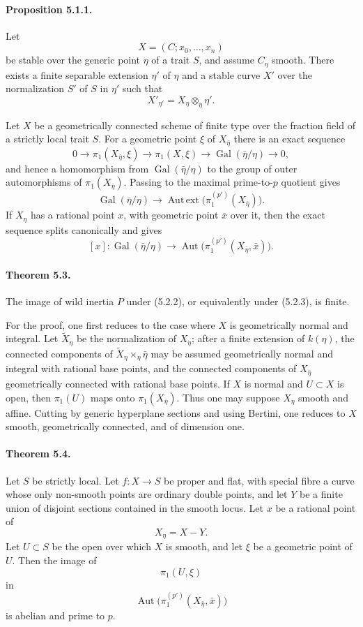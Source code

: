 \documentclass[12pt]{article}
\newcommand{\Gal}{\operatorname{Gal}}
\newcommand{\Aut}{\operatorname{Aut}}
\newcommand{\Autext}{\operatorname{Aut\,ext}}
\newcommand{\longto}{\longrightarrow}
\begin{document}
\paragraph{Proposition 5.1.1.}
Let
\[
X=(C;x_0,\ldots,x_n)
\]
be stable over the generic point $\eta$ of a trait $S$, and assume $C_\eta$ smooth. There exists a finite separable extension $\eta'$ of $\eta$ and a stable curve $X'$ over the normalization $S'$ of $S$ in $\eta'$ such that
\[
X'_{\eta'}=X_\eta\otimes_\eta\eta'.
\]

Let $X$ be a geometrically connected scheme of finite type over the fraction field of a strictly local trait $S$. For a geometric point $\xi$ of $X_{\bar\eta}$ there is an exact sequence
\[
0\longto \pi_1(X_{\bar\eta},\xi)\longto
\pi_1(X,\xi)\longto \Gal(\bar\eta/\eta)\longto0,
\tag{5.2.1}
\]
and hence a homomorphism from $\Gal(\bar\eta/\eta)$ to the group of outer automorphisms of $\pi_1(X_{\bar\eta})$. Passing to the maximal prime-to-$p$ quotient gives
\[
\Gal(\bar\eta/\eta)\longto
\Autext\bigl(\pi_1^{(p')}(X_{\bar\eta})\bigr).
\tag{5.2.2}
\]
If $X_\eta$ has a rational point $x$, with geometric point $\bar x$ over it, then the exact sequence splits canonically and gives
\[
[x]:\Gal(\bar\eta/\eta)\longto
\Aut\bigl(\pi_1^{(p')}(X_{\bar\eta},\bar x)\bigr).
\tag{5.2.3}
\]

\paragraph{Theorem 5.3.}
The image of wild inertia $P$ under (5.2.2), or equivalently under (5.2.3), is finite.

For the proof, one first reduces to the case where $X$ is geometrically normal and integral. Let $\widetilde X_\eta$ be the normalization of $X_\eta$; after a finite extension of $k(\eta)$, the connected components of $\widetilde X_\eta\times_\eta\bar\eta$ may be assumed geometrically normal and integral with rational base points, and the connected components of $X_{\bar\eta}$ geometrically connected with rational base points. If $X$ is normal and $U\subset X$ is open, then $\pi_1(U)$ maps onto $\pi_1(X_{\bar\eta})$. Thus one may suppose $X_\eta$ smooth and affine. Cutting by generic hyperplane sections and using Bertini, one reduces to $X$ smooth, geometrically connected, and of dimension one.

\paragraph{Theorem 5.4.}
Let $S$ be strictly local. Let $f:X\to S$ be proper and flat, with special fibre a curve whose only non-smooth points are ordinary double points, and let $Y$ be a finite union of disjoint sections contained in the smooth locus. Let $x$ be a rational point of
\[
X_\eta=X-Y.
\]
Let $U\subset S$ be the open over which $X$ is smooth, and let $\xi$ be a geometric point of $U$. Then the image of
\[
\pi_1(U,\xi)
\]
in
\[
\Aut\bigl(\pi_1^{(p')}(X_{\bar\eta},\bar x)\bigr)
\]
is abelian and prime to $p$.
\end{document}
